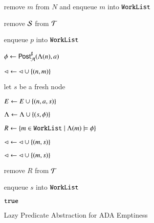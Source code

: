 \documentclass[10pt,conference,letterpaper,twocolumn]{IEEEtran}
\begin{document}
\begin{algorithm}[t!]
{\begin{algorithmic}[1]
  \State remove $m$ from $N$ and enqueue $m$ into $\mathtt{WorkList}$

  \State remove $\mathcal{S}$ from $\mathcal{T}$

  \State enqueue $p$ into $\mathtt{WorkList}$
  \label{ln:refine}

  \EndFor

  \EndIf

  \Else \label{ln:else}

  \label{ln:forall-events}

  \State $\phi \leftarrow {\mathsf{Post}}^\sharp_{\mathcal{A}}(\Lambda(n),a)$

   \label{ln:covered}

  \State $\lhd \leftarrow \lhd \cup \left\{ (n,m) \right\}$ 
  \label{ln:direct-cover}

  \Else 

  \State let $s$ be a fresh node

  \State $E \leftarrow E \cup \left\{ (n,a,s) \right\}$

  \State $\Lambda \leftarrow \Lambda \cup \left\{ (s,\phi) \right\}$

  \State $R \leftarrow \left\{ m \in \mathtt{WorkList} \mid \Lambda(m) \models
    \phi \right\}$ 

  

  \State $\lhd \leftarrow \lhd \cup \left\{ (m,s) \right\}$ 
  \label{ln:child-cover}

  \EndFor


  \State $\lhd \leftarrow \lhd \cup \left\{ (m,s) \right\}$ 
  \label{ln:indirect-cover}

  \EndFor

  \EndFor

  \State remove $R$ from $\mathcal{T}$

  \State enqueue $s$ into $\mathtt{WorkList}$ 
  \label{ln:expand}

  \EndIf

  \EndFor

  \EndIf

  \EndWhile

   $\mathtt{true}$
  \label{ln:true}
\end{algorithmic}}
\caption{Lazy Predicate Abstraction for ADA Emptiness}
\label{alg:predabs}
\end{algorithm}
\end{document}
